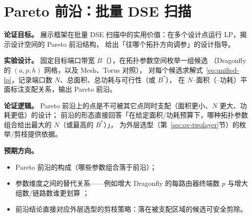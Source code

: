 \section{Pareto 前沿：批量 DSE 扫描}\label{sec:pareto}

\textbf{论证目标。}
展示框架在批量 DSE 扫描中的实用价值：在多个设计点运行 LP，揭示设计空间的 Pareto 前沿结构，
给出「往哪个拓扑方向调参」的设计指导。

\textbf{实验设计。}
固定目标端口带宽 $B$（），在拓扑参数空间枚举一组候选
（Dragonfly 的 $(a,p,h)$ 网格，以及 Mesh、Torus 对照），
对每个候选求解式~\eqref{eq:unified-lp}，记录端口数 $N$、总面积、总功耗与可行性（或 $B^*$），
在 $N$--面积（--功耗）平面标注支配关系，输出 Pareto 前沿。

\textbf{论证逻辑。}
Pareto 前沿上的点是不可被其它点同时支配（面积更小、$N$ 更大、功耗更低）的设计；
前沿的形态直接回答「在给定面积/功耗预算下，哪种拓扑参数组合给出最大的 $N$（或最高的 $B^*$）」，
为外层选型（第~\ref{sec:ov-twolayer}节）的枚举/剪枝提供依据。

\textbf{预期方向。}
\begin{itemize}
    \item Pareto 前沿的构成（哪些参数组合落于前沿）；
    \item 参数维度之间的替代关系——例如增大 Dragonfly 的每路由器终端数 $p$ 与增大组数/链路数谁更划算
    ；
    \item 前沿结论直接对应外层选型的剪枝策略：落在被支配区域的候选可安全剪除。
\end{itemize}
